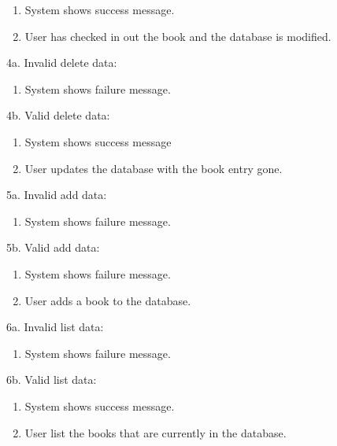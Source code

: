\documentclass[a4paper, 10pt, oneside, draft]{article}
\begin{document}
\begin{usecase}
{\begin{enumerate}[1.]
		\item System shows success message.
		\item User has checked in out the book and the database is modified.
		\end{enumerate}
	\item[4a.] Invalid delete data:
        \begin{enumerate}[1.]
		\item System shows failure message.
		\end{enumerate}
	\item[4b.] Valid delete data:
        \begin{enumerate}[1.]
		\item System shows success message
		\item User updates the database with the book entry gone.
		\end{enumerate}
	\item[5a.] Invalid add data:
        \begin{enumerate}[1.]
		\item System shows failure message.
		\end{enumerate}
	\item[5b.] Valid add data:
        \begin{enumerate}[1.]
		\item System shows failure message.
		\item User adds a book to the database.
		\end{enumerate}
	\item[6a.] Invalid list data:
        \begin{enumerate}[1.]
		\item System shows failure message.
		\end{enumerate}
	\item[6b.] Valid list data:
        \begin{enumerate}[1.]
		\item System shows success message.
		\item User list the books that are currently in the database.
		\end{enumerate}
}





\end{usecase}
\end{document}
